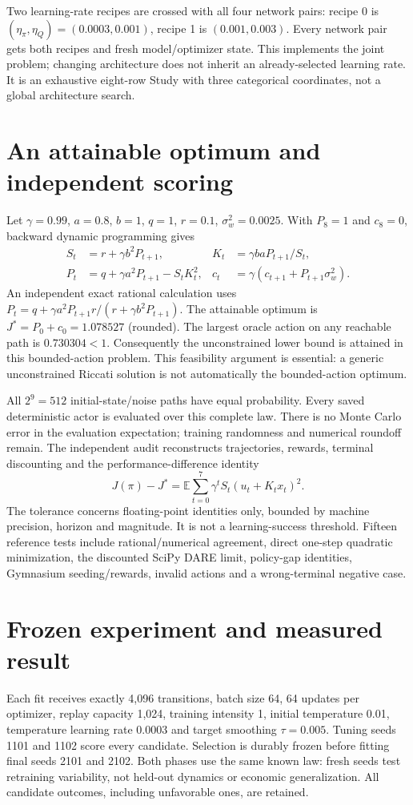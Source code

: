 Two learning-rate recipes are crossed with all four network pairs: recipe 0
is $(\eta_\pi,\eta_Q)=(0.0003,0.001)$, recipe 1 is $(0.001,0.003)$.
Every network pair gets both recipes and fresh model/optimizer state. This
implements the joint problem; changing architecture does not inherit an
already-selected learning rate. It is an exhaustive eight-row Study with
three categorical coordinates, not a global architecture search.

\section{An attainable optimum and independent scoring}
Let $\gamma=0.99$, $a=0.8$, $b=1$, $q=1$, $r=0.1$, $\sigma_w^2=0.0025$.
With $P_8=1$ and $c_8=0$, backward dynamic programming gives
\begin{align}
 S_t&=r+\gamma b^2P_{t+1}, & K_t&=\gamma baP_{t+1}/S_t,\\
 P_t&=q+\gamma a^2P_{t+1}-S_tK_t^2, &
 c_t&=\gamma(c_{t+1}+P_{t+1}\sigma_w^2).
\end{align}
An independent exact rational calculation uses
$P_t=q+\gamma a^2P_{t+1}r/(r+\gamma b^2P_{t+1})$.
The attainable optimum is $J^*=P_0+c_0=1.078527$ (rounded).
The largest oracle action on any reachable path is $0.730304<1$.
Consequently the unconstrained lower bound is attained in this bounded-action
problem. This feasibility argument is essential: a generic unconstrained
Riccati solution is not automatically the bounded-action optimum.

All $2^9=512$ initial-state/noise paths have equal probability. Every saved
deterministic actor is evaluated over this complete law. There is no Monte
Carlo error in the evaluation expectation; training randomness and numerical
roundoff remain. The independent audit reconstructs trajectories, rewards,
terminal discounting and the performance-difference identity
\[
 J(\pi)-J^*=\mathbb{E}\sum_{t=0}^{7}\gamma^tS_t(u_t+K_tx_t)^2.
\]
The tolerance concerns floating-point identities only, bounded by machine
precision, horizon and magnitude. It is not a learning-success threshold.
Fifteen reference tests include rational/numerical agreement, direct one-step
quadratic minimization, the discounted SciPy DARE limit, policy-gap identities,
Gymnasium seeding/rewards, invalid actions and a wrong-terminal negative case.

\section{Frozen experiment and measured result}
Each fit receives exactly 4,096 transitions, batch size 64, 64 updates per
optimizer, replay capacity 1,024, training intensity 1, initial temperature
0.01, temperature learning rate 0.0003 and target smoothing $\tau=0.005$.
Tuning seeds 1101 and 1102 score every candidate. Selection is durably frozen
before fitting final seeds 2101 and 2102. Both phases use the same known law:
fresh seeds test retraining variability, not held-out dynamics or economic
generalization. All candidate outcomes, including unfavorable ones, are retained.

